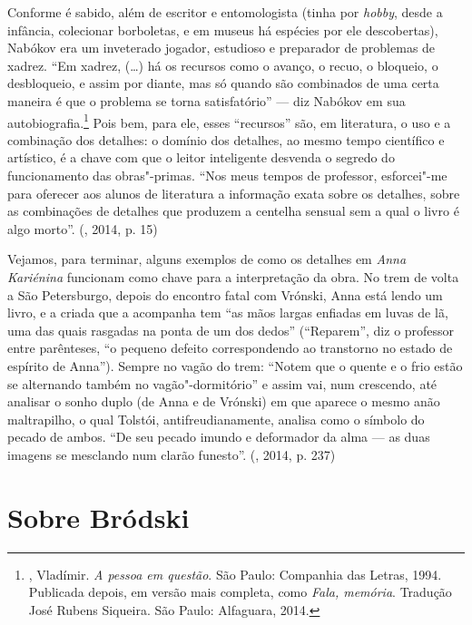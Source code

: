 {Conforme é sabido, além de escritor e entomologista (tinha por
\emph{hobby}, desde a infância, colecionar borboletas, e em museus
há espécies por ele descobertas), Nabókov era um inveterado
jogador, estudioso e preparador de problemas de xadrez. ``Em xadrez,
(\ldots{}) há os recursos como o avanço, o recuo, o bloqueio, o desbloqueio, e
assim por diante, mas só quando são combinados de uma certa maneira é
que o problema se torna satisfatório'' --- diz Nabókov em sua
autobiografia.\footnote{, Vladímir. \emph{A pessoa em questão}. São Paulo: Companhia das Letras, 1994.
Publicada depois, em versão mais completa, como \emph{Fala, memória}. Tradução José Rubens Siqueira. São Paulo: Alfaguara, 2014.} Pois bem,
para ele, esses ``recursos'' são, em literatura, o uso e a combinação
dos detalhes: o domínio dos detalhes, ao mesmo tempo científico e
artístico, é a chave com que o leitor inteligente desvenda o segredo
do funcionamento das obras"-primas. ``Nos meus tempos de professor,
esforcei"-me para oferecer aos alunos de literatura a informação exata
sobre os detalhes, sobre as combinações de detalhes que produzem a
centelha sensual sem a qual o livro é algo morto''.
(, 2014, p. 15)

Vejamos, para terminar, alguns exemplos de como os detalhes em
\emph{Anna Kariénina} funcionam como chave para a
interpretação da obra. No trem de volta a São Petersburgo, depois do
encontro fatal com Vrónski, Anna está lendo um livro, e a criada que a
acompanha tem ``as mãos largas enfiadas em luvas de lã, uma das quais
rasgadas na ponta de um dos dedos'' (``Reparem'', diz o
professor entre parênteses, ``o pequeno defeito
correspondendo ao transtorno no estado de espírito de Anna'').
Sempre no vagão do trem: ``Notem que o quente e o frio estão se
alternando também no vagão"-dormitório'' e assim vai, num crescendo, até
analisar o sonho duplo (de Anna e de Vrónski) em que aparece o mesmo
anão maltrapilho, o qual Tolstói, antifreudianamente, analisa como o
símbolo do pecado de ambos. ``De seu pecado imundo e deformador da alma
--- as duas imagens se mesclando num clarão funesto''. (, 2014, p. 237)

\chapter{Sobre Bródski}

}
